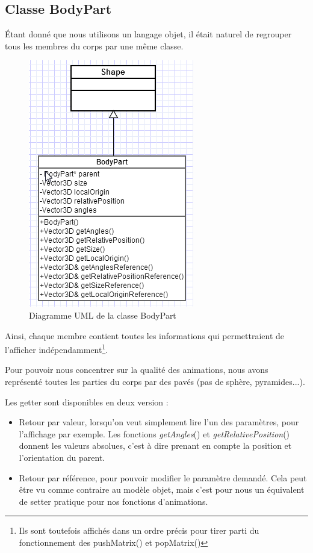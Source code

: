 \documentclass[10pt,a4paper,titlepage]{article}
\begin{document}
\subsection{Classe BodyPart}
Étant donné que nous utilisons un langage objet, il était naturel de regrouper tous les membres du corps par une même classe. 
\begin{figure}
\centering
\includegraphics[width=.4\textwidth]{UML_Body_part.png}
\caption{Diagramme UML de la classe BodyPart}
\end{figure}
\par
Ainsi, chaque membre contient toutes les informations qui permettraient de l'afficher indépendamment\footnote{Ils sont toutefois affichés dans un ordre précis pour tirer parti du fonctionnement des pushMatrix() et popMatrix()}. 
\par
Pour pouvoir nous concentrer sur la qualité des animations, nous avons représenté toutes les parties du corps par des pavés (pas de sphère, pyramides...).

Les getter sont disponibles en deux version :
\begin{itemize}
	\item Retour par valeur, lorsqu'on veut simplement lire l'un des paramètres, pour l'affichage par exemple. Les fonctions \textit{getAngles}() et \textit{getRelativePosition}() donnent les valeurs absolues, c'est à dire prenant en compte la position et l'orientation du parent.
	\item Retour par référence, pour pouvoir modifier le paramètre demandé. Cela peut être vu comme contraire au modèle objet, mais c'est pour nous un équivalent de setter pratique pour nos fonctions d'animations. 
\end{itemize}
\end{document}
